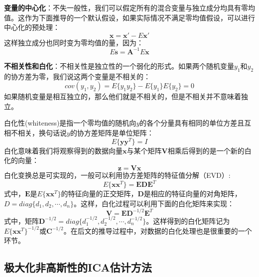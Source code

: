 \textbf{变量的中心化}：不失一般性，我们可以假定所有的混合变量与独立成分均具有零均值。这作为下面推导的一个默认假设，如果实际情况不满足零均值假设，可以进行中心化的预处理：
\begin{equation} 
    \mathbf{x}=\mathbf{x'}-E{\mathbf{x'}}
\end{equation}
这样独立成分也同时变为零均值的量，因为：
\begin{equation}
    E{\mathbf{s}}=\mathbf{A}^{-1}E{\mathbf{x}}
\end{equation}

\textbf{不相关性和白化}：不相关性是独立性的一个弱化的形式。如果两个随机变量$y_1$和$y_2$的协方差为零，我们说这两个变量是不相关的：
\begin{equation}
    cov(y_1,y_2)=E\{y_1y_2\}-E\{y_1\}E\{y_2\}=0
\end{equation}
如果随机变量是相互独立的，那么他们就是不相关的，但是不相关并不意味着独立。

白化性(whiteness)是指一个零均值的随机向$y$的各个分量具有相同的单位方差且互相不相关，换句话说$y$的协方差矩阵是单位矩阵：
\begin{equation}
    E\{\textbf{yy}^T\}=\mathbf{\mathit{I}}
\end{equation}
白化意味着我们将观察得到的数据向量$\mathbf{x}$与某个矩阵$\mathbf{V}$相乘后得到的是一个新的白化的向量：
\begin{equation}
    \mathbf{z}=\mathbf{Vx}
\end{equation}
白化变换总是可实现的，一般可以利用协方差矩阵的特征值分解（EVD）:
\begin{equation}
    E\{\textbf{xx}^T \}=\textbf{EDE}^T
\end{equation}
式中，$\mathbf{E}$是$E\{\mathbf{xx}^T \}$的特征向量的正交矩阵，$\textbf{D}$是相应的特征向量的对角矩阵，$D=diag\{d_1,d_2,\cdots,d_n\}$。这样，白化过程可以利用下面的白化矩阵来实现：
\begin{equation}
    \mathbf{V}=\mathbf{E}\mathbf{D}^{-1/2}\mathbf{E}^T
\end{equation}
式中，矩阵$\mathbf{D}^{-1/2}=diag\{d_1^{-1/2},d_2^{-1/2},\cdots,d_n^{-1/2}\}$。这样得到的白化矩阵记为$E\{\mathbf{xx}^T\}^{-1/2}$或$\mathbf{C}^{-1/2}$。在后文的推导过程中，对数据的白化处理也是很重要的一个环节。


\subsection{极大化非高斯性的ICA估计方法}

